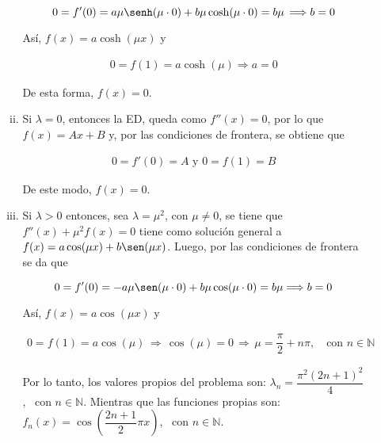 \documentclass[fleqn]{article}
\newcommand{\nat}{\mathbb{N}}
\begin{document}
\begin{enumerate}[I.]
\begin{enumerate}
\begin{enumerate}[i)]
				\begin{equation*}
					0 = f'(0) = a \mu \senh(\mu \cdot 0) + b \mu \cosh(\mu \cdot 0) = b \mu \, \Longrightarrow b = 0
				\end{equation*}

				Así, $ f(x) = a \cosh(\mu x) $ y 

				\begin{align*}
					0 = f(1) = a \cosh(\mu) \Longrightarrow a = 0
				\end{align*}
				
				De esta forma, $ f(x) = 0 $.

				\item Si $ \lambda = 0 $, entonces la ED, queda como $ f''(x) = 0 $, por lo que $ f(x) = Ax + B $ y, por las condiciones de frontera, se obtiene que 
				
				\begin{align*}
					0 = f'(0) = A \mbox{ y } 0 = f(1) = B
				\end{align*}

				De este modo, $ f(x) = 0 $.
				
				\item Si $ \lambda > 0 $ entonces, sea $ \lambda = \mu^2 $, con $ \mu \neq 0 $, se tiene que $ f''(x) + \mu^2 f(x) = 0 $
				tiene como solución general a $ f(x) = a \cos(\mu x) + b \sen(\mu x) $. Luego, por las condiciones de frontera se da que
				
				\begin{equation*}
					0 = f'(0) = -a \mu \sen (\mu \cdot 0) + b \mu \cos (\mu \cdot 0) = b \mu \Longrightarrow b = 0
				\end{equation*}

				Así, $ f(x) = a \cos(\mu x) $ y 

				\begin{align*}
					0 = f(1) = a \cos(\mu) \, \Longrightarrow \, \cos(\mu) = 0 \, \Longrightarrow \, \mu = \dfrac{\pi}{2} + n \pi, \quad \mbox{con } n \in \nat
				\end{align*}
				
				Por lo tanto, los valores propios del problema son: $ \lambda_n = \dfrac{\pi^2 (2n + 1)^2}{4} $, \, con $ n \in \nat $. Mientras que las funciones propias son: $ f_n (x) = \cos \left( \dfrac{2n + 1}{2} \pi x \right) $, \, con $ n \in \nat $.
			\end{enumerate} \vspace{3mm}



\end{enumerate}
\end{enumerate}
\end{document}
